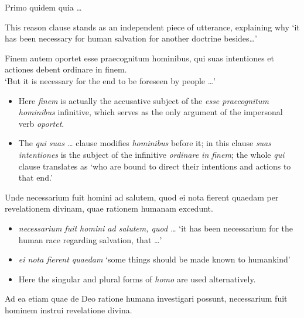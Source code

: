 \documentclass[a4paper, 12pt]{article}
\newcommand{\form}[1]{\emph{#1}}
\newcommand{\translate}[1]{`#1'}
\begin{document}
\begin{exe}
    \ex Primo quidem quia \dots
\end{exe}

This reason clause stands as an independent piece of utterance, 
explaining why \translate{it has been necessary for human salvation for another doctrine besides\dots} 

\begin{exe}
    \ex Finem autem oportet esse praecognitum hominibus, qui suas intentiones et actiones debent ordinare in finem. \\
    \translate{But it is necessary for the end to be foreseen by people \dots}
\end{exe}

\begin{itemize}
    \item Here \form{finem} is actually the accusative subject of the 
        \form{esse praecognitum hominibus} infinitive,
        which serves as the only argument of the impersonal verb \form{oportet}.
    \item The \form{qui suas \dots} clause modifies \form{hominibus} before it;
        in this clause \form{suas intentiones} is the subject of the 
        infinitive \form{ordinare in finem}; 
        the whole \form{qui} clause translates as 
        \translate{who are bound to direct their intentions and actions to that end.}
\end{itemize}

\begin{exe}
    \ex Unde necessarium fuit homini ad salutem, quod ei nota fierent quaedam per revelationem divinam, quae rationem humanam excedunt. 
\end{exe}

\begin{itemize}
    \item \form{necessarium fuit homini ad salutem, quod \dots} 
    \translate{it has been necessarium for the human race regarding salvation, that \dots}
    \item \form{ei nota fierent quaedam} 
    \translate{some things should be made known to humankind} 
    \item Here the singular and plural forms of \form{homo}
    are used alternatively.
\end{itemize}

\begin{exe}
    \ex Ad ea etiam quae de Deo ratione humana investigari possunt, necessarium fuit hominem instrui revelatione divina.
\end{exe}
\end{document}
